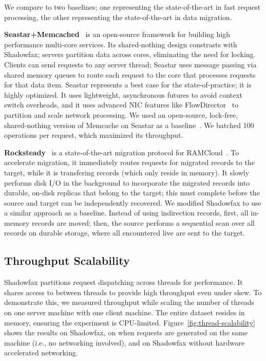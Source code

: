 We compare to two baselines; one representing the
state-of-the-art in fast request processing, the other representing the
state-of-the-art in data migration.

\noindent
\textbf{Seastar+Memcached}~\cite{seastar}
is an open-source framework for building high
performance multi-core services.
%
Its shared-nothing design constrasts with Shadowfax;
servers partition data across cores, eliminating the need for locking.
%
Clients can send requests to any server thread;
Seastar uses message passing via shared memory queues to route
each request to the core that processes requests for that data item.
%
Seastar represents a best case for the state-of-practice; it is highly optimized.
%
It uses lightweight, asynchronous futures to avoid
context switch overheads, and it uses advanced NIC features like
FlowDirector~\cite{flow-director} to partition and scale network processing.
%
We used an open-source, lock-free, shared-nothing version of
Memcache on Seastar as a baseline~\cite{seastar-apps}.
%
We batched 100 operations per request, which maximized its throughput.

\noindent
\textbf{Rocksteady}~\cite{rocksteady} is a state-of-the-art migration
protocol for RAMCloud~\cite{ramcloud}.
%
To accelerate migration, it immediately routes requests for migrated records
to the target, while it is transfering records (which only reside in memory).
%
It slowly performs disk I/O in the background to incorporate the migrated records
into durable, on-disk replicas that belong to the target; this must complete
before the source and target can be independently recovered.
%
%
We modified Shadowfax to use a similar approach as a baseline.
%
Instead of using indirection records, first, all in-memory records are moved;
then, the source performs a sequential scan over all records on durable
storage, where all encountered live are sent to the target.
%
%

\subsection{Throughput Scalability}
\label{sec:eval:clients}

Shadowfax partitions request dispatching across threads for
performance.
%
It shares access to \faster between threads to provide high
throughput even under skew.
%
To demonstrate this, we measured throughput while scaling the number of threads
on one server machine with one client machine.
%
The entire dataset resides in memory, ensuring the experiment is CPU-limited.
%
Figure~\ref{fig:thread-scalability} shows the results on Shadowfax, on
\faster when requests are generated on the same machine (i.e., no networking involved), and on Shadowfax without
hardware accelerated networking.

